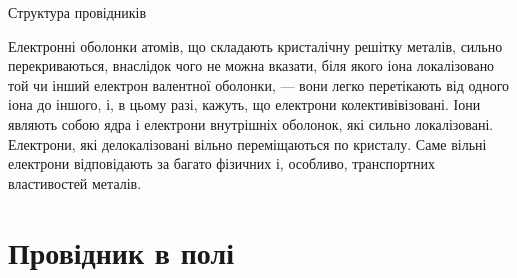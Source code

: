 \documentclass{beamer}
\begin{document}
\begin{frame}[fragile]{Структура провідників}{}
\begin{center}
\begin{tikzpicture}[>=latex]
		\end{tikzpicture}
	\end{center}

	\begin{block}{}\justifying\scriptsize
		Електронні оболонки атомів, що складають кристалічну решітку металів, сильно
		перекриваються, внаслідок чого не можна вказати, біля якого іона локалізовано той чи інший
		\alert{електрон валентної оболонки}, --- вони легко перетікають від одного іона до іншого,
		і, в цьому разі, кажуть, що \alert{електрони колективівізовані}. Іони являють собою ядра і
		електрони внутрішніх оболонок, які сильно локалізовані. Електрони, які делокалізовані
		вільно переміщаються по кристалу. Саме вільні електрони відповідають за багато фізичних і,
		особливо, транспортних властивостей металів.
	\end{block}

\end{frame}




\section{Провідник в полі}
\end{document}

